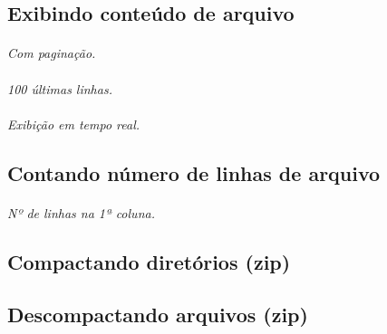 \documentclass[a4paper,9pt]{extarticle}
\begin{document}
\begin{multicols}{2}
	\paragraph{}
	
\subsection{Exibindo conteúdo de arquivo}

	\paragraph{}
	
	\paragraph{} \emph{Com paginação.}
	
	\paragraph{} \emph{100 últimas linhas.}
	
	\paragraph{} \emph{Exibição em tempo real.}

\subsection{Contando número de linhas de arquivo}
	
	\paragraph{} \emph{Nº de linhas na 1ª coluna.}
	
\subsection{Compactando diretórios (zip)}
	

\subsection{Descompactando arquivos (zip)}
	

\end{multicols}
\end{document}
